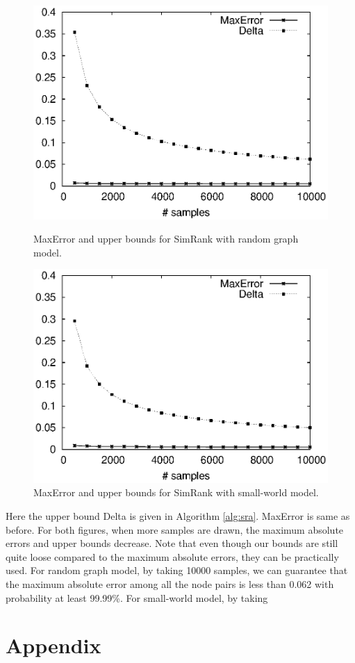 \documentclass{article}
\begin{document}
\begin{figure}[!t]
\centering
\begin{minipage}{.45\textwidth}
\centering
\includegraphics[width=.9\textwidth]{simrank_rg_apprx_error.eps}
\caption{\textsf{MaxError} and upper bounds for SimRank with random graph model.}
\label{fig:rgae}
\end{minipage}
\hspace{1cm}
\begin{minipage}{.45\textwidth}
\centering
\includegraphics[width=.9\textwidth]{simrank_sw_apprx_error.eps}
\caption{\textsf{MaxError} and upper bounds for SimRank with small-world model.}
\label{fig:swae}
\end{minipage}
\end{figure}

Here the upper bound \textsf{Delta} is given in Algorithm \ref{alg:sra}. \textsf{MaxError} is same as before. 
For both figures, when more samples are drawn, the maximum absolute errors and upper bounds decrease. Note that even though our bounds are still quite loose compared to the maximum absolute errors, they can be practically used. For random graph model, by taking 10000 samples, we can guarantee that the maximum absolute error among all the node pairs is less than 0.062 with probability at least 99.99\%. For small-world model, by taking 

%



\section{Appendix}

\end{document}

